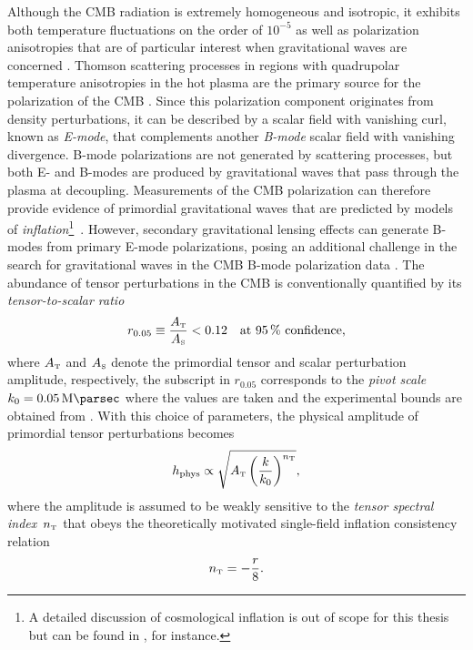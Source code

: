 Although the CMB radiation is extremely homogeneous and isotropic, it exhibits both temperature fluctuations on the order of \(10^{-5}\) as well as polarization an\-iso\-tro\-pies that are of particular interest when gravitational waves are concerned \autocite{Hu2008,Challinor2012}. Thomson scattering processes in regions with quadrupolar temperature anisotropies in the hot plasma are the primary source for the polarization of the CMB \autocite{Hu2008}. Since this polarization component originates from density perturbations, it can be described by a scalar field with vanishing curl, known as \emph{E-mode}, that complements another \emph{B-mode} scalar field with vanishing divergence. B-mode polarizations are not generated by scattering processes, but both E- and B-modes are produced by gravitational waves that pass through the plasma at decoupling. Measurements of the CMB polarization can therefore provide evidence of primordial gravitational waves that are predicted by models of \emph{inflation}\footnote{A detailed discussion of cosmological inflation is out of scope for this thesis but can be found in \textcite{TASI2009}, for instance.}~\autocite{Starobinsky1979,Abbott1984}. However, secondary gravitational lensing effects can generate B-modes from primary E-mode polarizations, posing an additional challenge in the search for gravitational waves in the CMB B-mode polarization data \autocite{Challinor2012}. The abundance of tensor perturbations in the CMB is conventionally quantified by its \emph{tensor-to-scalar ratio}
\begin{equation}\label{eq:tens_scal_ratio}
	r_{0.05} \equiv \frac{A_{\textnormal{\tiny{T}}}}{A_{\textnormal{\tiny{S}}}} < 0.12 \quad \text{at \SI{95}{\percent} confidence,}
\end{equation}
where \(A_{\textnormal{\tiny{T}}}\) and \(A_{\textnormal{\tiny{S}}}\) denote the primordial tensor and scalar perturbation amplitude, respectively, the subscript in \(r_{0.05}\) corresponds to the \emph{pivot scale} \(k_0 = \SI{0.05}{\per\mega\parsec}\) where the values are taken and the experimental bounds are obtained from \textcite{BKP2015}. With this choice of parameters, the physical amplitude of primordial tensor perturbations becomes
\begin{equation}\label{eq:phys_ampl}
	h_\textnormal{phys} \propto \sqrt{A_\tenspert\del{\frac{k}{k_0}}^{n_\tenspert}}
	\eqpunct{,}
\end{equation}
where the amplitude is assumed to be weakly sensitive to the \emph{tensor spectral index}~\(n_{\textnormal{\tiny{T}}}\) that obeys the theoretically motivated single-field inflation consistency relation \autocite{Planck2015Data}
\begin{equation}
	n_{\textnormal{\tiny{T}}} = -\frac{r}{8}
	\mathpunct{.}
\end{equation}

